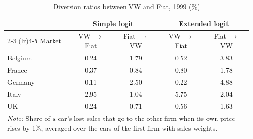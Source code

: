\begin{table}[htbp]
\centering
\small
\caption{Diversion ratios between VW and Fiat, 1999 (\%)}
\label{tab:diversion}
\begin{tabular}{lcccc}
\toprule
 & \multicolumn{2}{c}{Simple logit} & \multicolumn{2}{c}{Extended logit} \\
\cmidrule(lr){2-3} \cmidrule(lr){4-5}
Market & VW $\to$ Fiat & Fiat $\to$ VW & VW $\to$ Fiat & Fiat $\to$ VW \\
\midrule
Belgium & 0.24 & 1.79 & 0.52 & 3.83 \\
France & 0.37 & 0.84 & 0.80 & 1.78 \\
Germany & 0.11 & 2.50 & 0.22 & 4.88 \\
Italy & 2.95 & 1.04 & 5.75 & 2.04 \\
UK & 0.24 & 0.71 & 0.56 & 1.63 \\
\bottomrule
\multicolumn{5}{p{0.85\linewidth}}{\footnotesize \textit{Note:} Share of a car\textquoteright s lost sales that go to the other firm when its own price rises by 1\%, averaged over the cars of the first firm with sales weights.} \\
\end{tabular}
\end{table}
